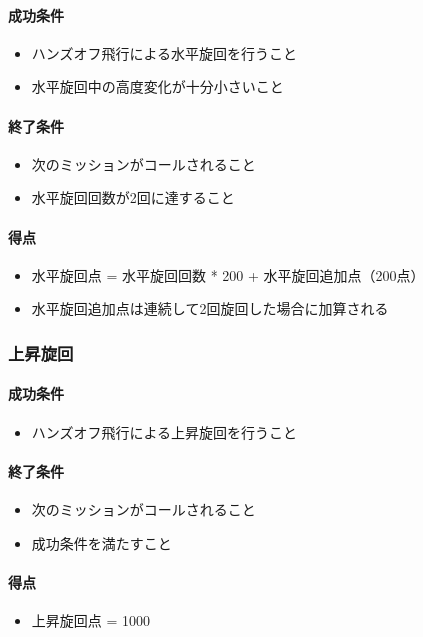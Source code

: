 \paragraph{成功条件}
\begin{itemize}
\item ハンズオフ飛行による水平旋回を行うこと
\item 水平旋回中の高度変化が十分小さいこと
\end{itemize}
\paragraph{終了条件}
\begin{itemize}
\item 次のミッションがコールされること
\item 水平旋回回数が2回に達すること
\end{itemize}
\paragraph{得点}
\begin{itemize}
\item 水平旋回点 = 水平旋回回数 * 200 + 水平旋回追加点（200点）
\item 水平旋回追加点は連続して2回旋回した場合に加算される
\end{itemize}

\subsubsection{上昇旋回}
\paragraph{成功条件}
\begin{itemize}
\item ハンズオフ飛行による上昇旋回を行うこと
\end{itemize}
\paragraph{終了条件}
\begin{itemize}
\item 次のミッションがコールされること
\item 成功条件を満たすこと
\end{itemize}
\paragraph{得点}
\begin{itemize}
\item 上昇旋回点 = 1000
\end{itemize}

